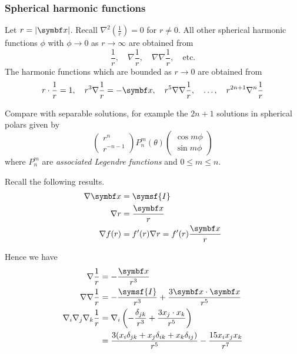 \documentclass{jknotes}
\begin{document}
\subsubsection{Spherical harmonic functions}
Let $r = \abs{\x}$. Recall $\nabla^2 (\frac{1}{r}) = 0$ for $r \ne 0$. All
other spherical harmonic functions $\phi$ with $\phi \to 0$ as $r \to \infty$
are obtained from 
\begin{equation}
	\frac{1}{r}, \hspace{1em}\nabla \frac{1}{r},\hspace{1em} \nabla \nabla
	\frac{1}{r}, \hspace{1em}\text{etc.}
\end{equation}
The harmonic functions which are bounded as $r \to 0$ are
obtained from 
\begin{equation}
	r \cdot \inv{r} = 1,\hspace{1em} r^3 \nabla \inv{r} = -\x,\hspace{1em} r^5 \nabla
\nabla \inv{r},\hspace{1em} \dots,\hspace{1em} r^{2n+1} \nabla^n \inv{r}
\end{equation}

Compare with separable solutions, for example the $2n+1$ solutions in
spherical polars given by
\begin{equation}
\begin{pmatrix} r^n \\ r^{-n-1} \end{pmatrix} P_n^m(\theta) \begin{pmatrix}
\cos m \phi \\ \sin m\phi\end{pmatrix}
\end{equation}
where $P_n^m$ are \emph{associated Legendre functions} and $0 \le m \le n$.


Recall the following results.
\begin{equation}
	\begin{aligned}
		\nabla \x &= \symsf{I} \\
		\nabla r &= \frac{\x}{r} \\
		\nabla f(r) &= f'(r) \nabla r = f'(r) \frac{\x}{r}
	\end{aligned}
\end{equation}

Hence we have
\begin{equation}
	\begin{aligned}
		\nabla \inv{r} &= -\frac{\x}{r^3} \\
		\nabla \nabla \inv{r} &= -\frac{\symsf{I}}{r^3} +
		\frac{3\x\cdot\x}{r^5} \\
		\nabla_i \nabla_j \nabla_k \inv{r} &= \nabla_i \left(
		-\frac{\delta_{jk}}{r^3} + \frac{3x_j\cdot x_k}{r^5}\right)\\
		&= \frac{3(x_i \delta_{jk} + x_j \delta_{ik} + x_k \delta_{ij})}{r^5}
		- \frac{15 x_i x_j x_k}{r^7}
	\end{aligned}
\end{equation}
\end{document}
